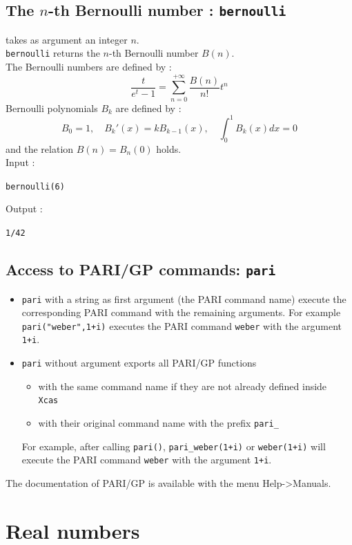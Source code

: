 \documentclass[a4paper,11pt]{book}
\begin{document}
\subsection{The $n$-th Bernoulli number : {\tt bernoulli}}
 takes as argument an integer $n$.\\
{\tt bernoulli} returns the $n$-th Bernoulli number $B(n)$.\\
The Bernoulli numbers are defined by :
\[ \frac{t}{e^t-1}=\sum_{n=0}^{+\infty} \frac{B(n)}{n!}t^n \]
Bernoulli polynomials $B_k$ are defined by :
\[ B_0=1, \quad B_k{'}(x)=kB_{k-1}(x), \quad  \int_0^1B_k(x)dx=0 \]
and the relation $B(n)=B_n(0)$ holds.\\
Input :
\begin{center}{\tt bernoulli(6)}\end{center}
Output :
\begin{center}{\tt 1/42}\end{center}

\subsection{Access to PARI/GP commands: {\tt pari}}
\begin{itemize}
\item
{\tt pari} with a string as first argument (the  PARI command name) 
execute the corresponding PARI command with the remaining arguments. 
For example {\tt pari("weber",1+i)} executes the PARI command 
{\tt weber} with the argument {\tt 1+i}.
\item
{\tt pari} without argument exports all PARI/GP functions 
\begin{itemize}
\item with the same command name if they are not already defined inside {\tt
    Xcas}
\item with their original command name with the prefix {\tt pari\_}
\end{itemize}
For example, after calling {\tt pari()}, {\tt pari\_weber(1+i)} or
{\tt weber(1+i)} will execute the PARI command 
{\tt weber} with the argument {\tt 1+i}.
\end{itemize}

The documentation of PARI/GP is available with the menu
Help->Manuals.

\section{Real numbers}
\end{document}
